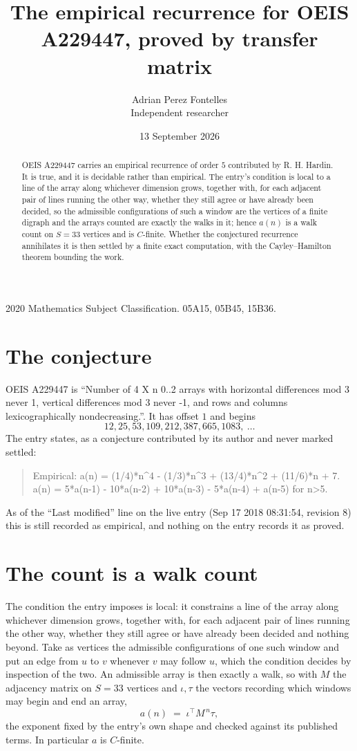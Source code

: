 \documentclass[11pt,a4paper]{article}
\title{The empirical recurrence for OEIS A229447, proved by transfer matrix}
\author{Adrian Perez Fontelles\\ \small Independent researcher}
\date{13 September 2026}
\theoremstyle{plain}
\theoremstyle{definition}
\begin{document}
\maketitle

\begin{abstract}
OEIS A229447 carries an empirical recurrence of order $5$ contributed by R. H. Hardin. It is
true, and it is decidable rather than empirical. The entry's condition is local to a line of the array along whichever dimension grows, together with, for each adjacent pair of lines running the other way, whether they still agree or have already been decided, so
the admissible configurations of such a window are the vertices of a finite digraph and the
arrays counted are exactly the walks in it; hence $a(n)$ is a walk count on $S=33$ vertices
and is $C$-finite. Whether the conjectured recurrence annihilates it is then settled by a
finite exact computation, with the Cayley--Hamilton theorem bounding the work.
\end{abstract}

\noindent\small 2020 Mathematics Subject Classification. 05A15, 05B45, 15B36.\normalsize

\section{The conjecture}

OEIS A229447 is ``Number of 4 X n 0..2 arrays with horizontal differences mod 3 never 1, vertical differences mod 3 never -1, and rows and columns lexicographically nondecreasing.''. It has offset $1$ and begins
\[
12, 25, 53, 109, 212, 387, 665, 1083,\ \dots
\]
The entry states, as a conjecture contributed by its author and never marked settled:
\begin{quote}
Empirical: a(n) = (1/4)*n\^{}4 - (1/3)*n\^{}3 + (13/4)*n\^{}2 + (11/6)*n + 7. a(n) = 5*a(n-1) - 10*a(n-2) + 10*a(n-3) - 5*a(n-4) + a(n-5) for n>5.
\end{quote}
As of the ``Last modified'' line on the live entry (Sep 17 2018 08:31:54, revision 8) this is still
recorded as empirical, and nothing on the entry records it as proved.

\section{The count is a walk count}

The condition the entry imposes is local: it constrains a line of the array along whichever dimension grows, together with, for each adjacent pair of lines running the other way, whether they still agree or have already been decided and nothing beyond. Take as
vertices the admissible configurations of one such window and put an edge from $u$ to $v$
whenever $v$ may follow $u$, which the condition decides by inspection of the two. An
admissible array is then exactly a walk, so with $M$ the adjacency matrix on $S=33$ vertices
and $\iota,\tau$ the vectors recording which windows may begin and end an array,
\[
a(n)\;=\;\iota^{\!\top}M^{\,n}\tau ,
\]
the exponent fixed by the entry's own shape and checked against its published terms. In
particular $a$ is $C$-finite.
\end{document}
